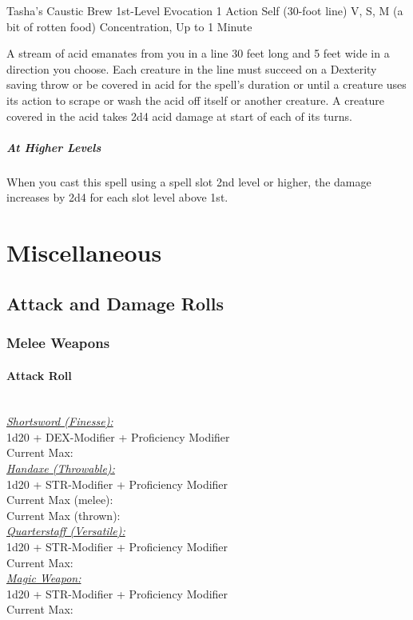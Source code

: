 \documentclass[letterpaper,openany,oneside,twocolumn]{book}
\begin{document}
\DndSpellHeader
  {Tasha's Caustic Brew}
  {1st-Level Evocation}
  {1 Action}
  {Self (30-foot line)}
  {V, S, M (a bit of rotten food)}
  {Concentration, Up to 1 Minute}

A stream of acid emanates from you in a line 30 feet long and 5 feet wide in a direction you choose. Each creature in the line must succeed on a Dexterity saving throw or be covered in acid for the spell's duration or until a creature uses its action to scrape or wash the acid off itself or another creature. A creature covered in the acid takes 2d4 acid damage at start of each of its turns.

\subparagraph*{At Higher Levels} When you cast this spell using a spell slot 2nd level or higher, the damage increases by 2d4 for each slot level above 1st.

\vfill\eject
\section*{Miscellaneous}
\subsection*{Attack and Damage Rolls}
\subsubsection*{Melee Weapons}
\paragraph*{Attack Roll}\hfill\\
\underline{\textit{Shortsword (Finesse):}}\\
1d20 + DEX-Modifier + Proficiency Modifier\\
\indent Current Max: 
\\
\underline{\textit{Handaxe (Throwable):}}\\
1d20 + STR-Modifier + Proficiency Modifier\\
\indent Current Max (melee): \\
\indent Current Max (thrown): 
\\
\underline{\textit{Quarterstaff (Versatile):}}\\
1d20 + STR-Modifier + Proficiency Modifier\\
\indent Current Max: 
\\
\underline{\textit{Magic Weapon:}}\\
1d20 + STR-Modifier + Proficiency Modifier\\
\indent Current Max: 
\end{document}
